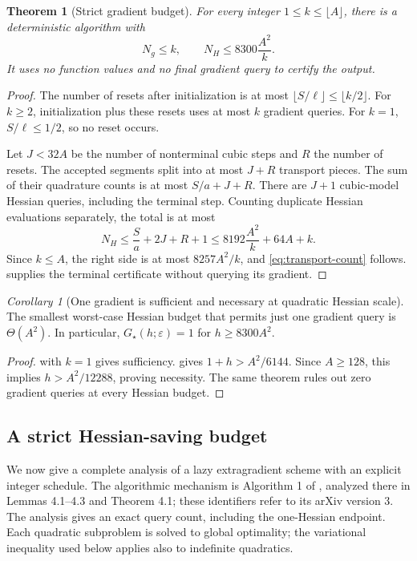\documentclass[11pt]{article}
\newtheorem{theorem}{Theorem}[section]
\newtheorem{corollary}[theorem]{Corollary}
\theoremstyle{remark}
\newtheorem{corollary}[corollary]{Corollary}
\theoremstyle{remark}
\newcommand{\eps}{\varepsilon}
\newcommand{\G}{G_\star}
\begin{document}
\begin{theorem}[Strict gradient budget]\label{thm:transport}
For every integer $1\le k\le\lfloor A\rfloor$, there is a deterministic algorithm with
\begin{equation}\label{eq:transport-count}
 N_g\le k,\qquad N_H\le8300\frac{A^2}{k}.
\end{equation}
It uses no function values and no final gradient query to certify the output.
\end{theorem}
\begin{proof}
The number of resets after initialization is at most $\lfloor S/\ell\rfloor\le\lfloor k/2\rfloor$. For $k\ge2$, initialization plus these resets uses at most $k$ gradient queries. For $k=1$, $S/\ell\le1/2$, so no reset occurs.

Let $J<32A$ be the number of nonterminal cubic steps and $R$ the number of resets. The accepted segments split into at most $J+R$ transport pieces. The sum of their quadrature counts is at most $S/a+J+R$. There are $J+1$ cubic-model Hessian queries, including the terminal step. Counting duplicate Hessian evaluations separately, the total is at most
\[
 N_H\le\frac{S}{a}+2J+R+1
 \le8192\frac{A^2}{k}+64A+k.
\]
Since $k\le A$, the right side is at most $8257A^2/k$, and \eqref{eq:transport-count} follows.  supplies the terminal certificate without querying its gradient.
\end{proof}

\begin{corollary}[One gradient is sufficient and necessary at quadratic Hessian scale]\label{cor:one-gradient}
The smallest worst-case Hessian budget that permits just one gradient query is $\Theta(A^2)$. In particular, $\G(h;\eps)=1$ for $h\ge8300A^2$.
\end{corollary}
\begin{proof}
 with $k=1$ gives sufficiency.  gives $1+h>A^2/6144$. Since $A\ge128$, this implies $h>A^2/12288$, proving necessity. The same theorem rules out zero gradient queries at every Hessian budget.
\end{proof}

\subsection{A strict Hessian-saving budget}\label{sec:lazy}
We now give a complete analysis of a lazy extragradient scheme with an explicit integer schedule. The algorithmic mechanism is Algorithm 1 of \cite{chen}, analyzed there in Lemmas 4.1--4.3 and Theorem 4.1; these identifiers refer to its arXiv version 3. The analysis gives an exact query count, including the one-Hessian endpoint. Each quadratic subproblem is solved to global optimality; the variational inequality used below applies also to indefinite quadratics.
\end{document}
